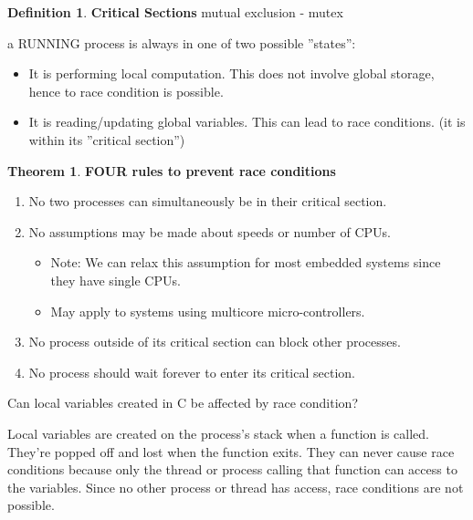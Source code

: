 \documentclass[12pt,a4paper]{article}
\theoremstyle{definition}
\newtheorem{theorem}{Theorem}[section]
\newtheorem{definition}{Definition}[section]
\newenvironment{myitemize}
{ \begin{itemize}
    \setlength{\itemsep}{5pt}
    \setlength{\parskip}{0pt}
    \setlength{\parsep}{0pt}     }
{ \end{itemize}                  }
\newenvironment{myenumerate}
{ \begin{enumerate}
    \setlength{\itemsep}{5pt}
    \setlength{\parskip}{0pt}
    \setlength{\parsep}{0pt}     }
{ \end{enumerate}                }
\begin{document}
\begin{definition}{\textbf{Critical Sections} mutual exclusion - \textsf{mutex}}
	
	a RUNNING process is always in one of two possible ''states'':
	\begin{myitemize}
		\item It is performing local computation. This does not involve global storage, hence to race condition is possible.
		\item It is reading/updating global variables. This can lead to race conditions. (it is within its ''critical section'')
	\end{myitemize}
\end{definition}

\begin{theorem}{\textbf{FOUR rules to prevent race conditions}}
	\begin{myenumerate}
		\item No two processes can simultaneously be in their critical section.
		\item No assumptions may be made about speeds or number of CPUs.
		\begin{myitemize}
			\item Note: We can relax this assumption for most embedded systems since they have single CPUs.
			\item May apply to systems using multicore micro-controllers.
		\end{myitemize}
		\item No process outside of its critical section can block other processes.
		\item No process should wait forever to enter its critical section.
	\end{myenumerate}
\end{theorem}

\begin{tcolorbox}
	\textsf{Can local variables created in C be affected by race condition?}
	
	Local variables are created on the process’s stack when a function is called. They’re popped off and lost when the function exits. They can never cause race conditions because only the thread or process calling that function can access to the variables.  Since no other process or thread has access, race conditions are not possible.
\end{tcolorbox}
\end{document}
